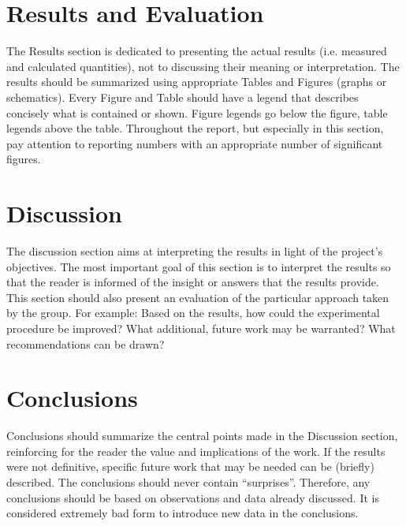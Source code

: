 \documentclass[10pt]{article}
\begin{document}
\section{Results and Evaluation}
The Results section is dedicated to presenting the actual results (i.e. measured and calculated quantities), not to discussing their meaning or interpretation. The results should be summarized using appropriate Tables and Figures (graphs or schematics). Every Figure and Table should have a legend that describes concisely what is contained or shown. Figure legends go below the figure, table legends above the table. Throughout the report, but especially in this section, pay attention to reporting numbers with an appropriate number of significant figures. 

\section{Discussion}
The discussion section aims at interpreting the results in light of the project's objectives. The most important goal of this section is to interpret the results so that the reader is informed of the insight or answers that the results provide. This section should also present an evaluation of the particular approach taken by the group. For example: Based on the results, how could the experimental procedure be improved? What additional, future work may be warranted? What recommendations can be drawn?


\section{Conclusions}
Conclusions should summarize the central points made in the Discussion section, reinforcing for the reader the value and implications of the work. If the results were not definitive, specific future work that may be needed can be (briefly) described. The conclusions should never contain ``surprises''. Therefore, any conclusions should be based on observations and data already discussed. It is considered extremely bad form to introduce new data in the conclusions.


\end{document}
